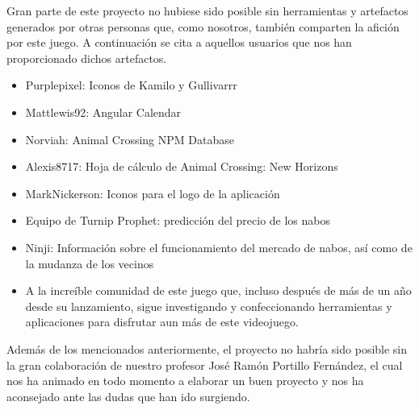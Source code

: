 
Gran parte de este proyecto no hubiese sido posible sin herramientas y artefactos generados por otras personas que, como nosotros, también comparten la afición por este juego. A continuación se cita a aquellos usuarios que nos han proporcionado dichos artefactos.

\begin{itemize}
	\item Purplepixel: Iconos de Kamilo y Gullivarrr
	\item Mattlewis92: Angular Calendar
	\item Norviah: Animal Crossing NPM Database
	\item Alexis8717: Hoja de cálculo de Animal Crossing: New Horizons
	\item MarkNickerson: Iconos para el logo de la aplicación
	\item Equipo de Turnip Prophet: predicción del precio de los nabos
	\item Ninji: Información sobre el funcionamiento del mercado de nabos, así como de la mudanza de los vecinos
	\item A la increíble comunidad de este juego que, incluso después de más de un año desde su lanzamiento, sigue investigando y confeccionando herramientas y aplicaciones para disfrutar aun más de este videojuego.
\end{itemize}

Además de los mencionados anteriormente, el proyecto no habría sido posible sin la gran colaboración de nuestro profesor José Ramón Portillo Fernández, el cual nos ha animado en todo momento a elaborar un buen proyecto y nos ha aconsejado ante las dudas que han ido surgiendo.\\

